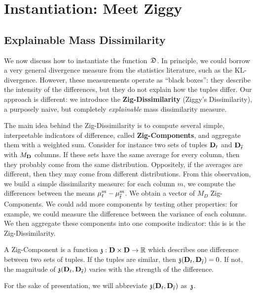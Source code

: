 \section{Instantiation: Meet Ziggy}
\label{sec:instantiation}
\subsection{Explainable Mass Dissimilarity}
\label{sec:explain}
We now discuss how to instantiate the function~$\mathfrak{D}$. In principle, we could
borrow a very general divergence measure from the statistics literature, such
as the KL-divergence. However, these measurements operate as ``black boxes'':
they describe the intensity of the differences, but they do not explain how the
tuples differ. Our approach is different: we introduce the
\textbf{Zig-Dissimilarity} (Ziggy's Dissimilarity), a purposely naive, but
completely \emph{explainable}  mass dissimilarity measure.

The main idea behind the Zig-Dissimilarity is to compute several simple,
interpretable indicators of difference, called \textbf{Zig-Components}, and
aggregate them with a weighted sum.  Consider for instance two sets of tuples
$\mathbf{D}_t$ and $\mathbf{D}_{\overline{t}}$ with $M_\rb{D}$ columns. If these sets have the
same average for every column, then they probably come from the same
distribution. Oppositely, if the averages are different, then they may come
from different distributions. From this observation, we build a simple
dissimilarity measure: for each column $m$, we compute the differences between
the means $\mu^m_t - \mu^m_{\overline{t}}$. We obtain a vector of $M_D$ 
Zig-Components. We could add more components by testing other properties: for example, we
could measure the difference between the variance of each columns.
We then aggregate these components into one composite
indicator: this is is the Zig-Dissimilarity.

\begin{definition}
    A Zig-Component is a function $\mathfrak{z} : \mathbf{D}\times\mathbf{D} \to \mathbb{R}$
    which describes one difference between two sets of tuples. If the tuples
    are similar, then $\mathfrak{z}(\mathbf{D}_t, \mathbf{D}_{\overline{t}}) = 0$. If not,
    the magnitude of $\mathfrak{z}(\mathbf{D}_t, \mathbf{D}_{\overline{t}})$ varies with the strength
    of the difference.
\end{definition}
For the sake of presentation, we will abbreviate $\mathfrak{z}(\mathbf{D}_t,
\mathbf{D}_{\overline{t}})$ as~$\mathfrak{z}$.

